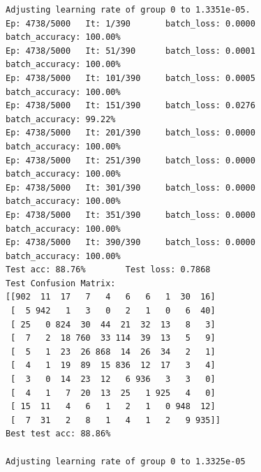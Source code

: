 \begin{verbatim}
Adjusting learning rate of group 0 to 1.3351e-05.
Ep: 4738/5000   It: 1/390       batch_loss: 0.0000      batch_accuracy: 100.00%
Ep: 4738/5000   It: 51/390      batch_loss: 0.0001      batch_accuracy: 100.00%
Ep: 4738/5000   It: 101/390     batch_loss: 0.0005      batch_accuracy: 100.00%
Ep: 4738/5000   It: 151/390     batch_loss: 0.0276      batch_accuracy: 99.22%
Ep: 4738/5000   It: 201/390     batch_loss: 0.0000      batch_accuracy: 100.00%
Ep: 4738/5000   It: 251/390     batch_loss: 0.0000      batch_accuracy: 100.00%
Ep: 4738/5000   It: 301/390     batch_loss: 0.0000      batch_accuracy: 100.00%
Ep: 4738/5000   It: 351/390     batch_loss: 0.0000      batch_accuracy: 100.00%
Ep: 4738/5000   It: 390/390     batch_loss: 0.0000      batch_accuracy: 100.00%
Test acc: 88.76%        Test loss: 0.7868
Test Confusion Matrix:
[[902  11  17   7   4   6   6   1  30  16]
 [  5 942   1   3   0   2   1   0   6  40]
 [ 25   0 824  30  44  21  32  13   8   3]
 [  7   2  18 760  33 114  39  13   5   9]
 [  5   1  23  26 868  14  26  34   2   1]
 [  4   1  19  89  15 836  12  17   3   4]
 [  3   0  14  23  12   6 936   3   3   0]
 [  4   1   7  20  13  25   1 925   4   0]
 [ 15  11   4   6   1   2   1   0 948  12]
 [  7  31   2   8   1   4   1   2   9 935]]
Best test acc: 88.86%

Adjusting learning rate of group 0 to 1.3325e-05


\end{verbatim}

